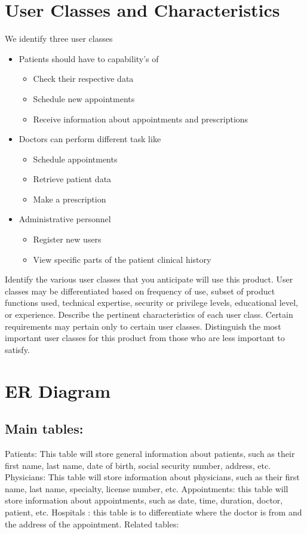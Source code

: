 \documentclass{scrreprt}
\begin{document}
	\section{User Classes and Characteristics}
	We identify three user classes
	\begin{itemize}
		\item Patients should have to capability's of 
		\begin{itemize}
			\item Check their respective data
			\item Schedule new appointments
			\item Receive information about appointments and prescriptions
		\end{itemize}
		\item Doctors can perform different task like
		\begin{itemize}
			\item Schedule appointments
			\item Retrieve patient data
			\item Make a prescription 
		\end{itemize}
		\item Administrative personnel
		\begin{itemize}
			\item Register new users
			\item View specific parts of the patient clinical history
		\end{itemize}
	\end{itemize}
	
	Identify the various user classes that you anticipate will use this product.  
	User classes may be differentiated based on frequency of use, subset of product 
	functions used, technical expertise, security or privilege levels, educational 
	level, or experience. Describe the pertinent characteristics of each user class.  
	Certain requirements may pertain only to certain user classes. Distinguish the 
	most important user classes for this product from those who are less important 
	to satisfy.
	\pagebreak


	
	\section{ER Diagram}
	\subsection{Main tables:}
	Patients: This table will store general information about patients, such as their first name, last name, date of birth, social security number, address, etc.
	Physicians: This table will store information about physicians, such as their first name, last name, specialty, license number, etc.
	Appointments: this table will store information about appointments, such as date, time, duration, doctor, patient, etc.
	Hospitals : this table is to differentiate where the doctor is from and the address of the appointment.  
	Related tables:
	
\end{document}
